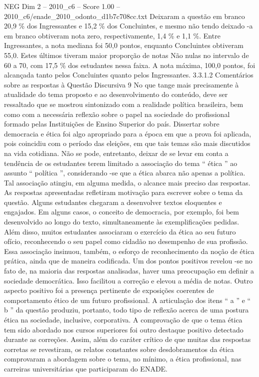 \begin{textsample}{NEG Dim 2 – 2010\_c6 – Score 1.00 – 2010\_c6/enade\_2010\_odonto\_d1b7c708cc.txt}
Deixaram a questão em branco 20,9 \% dos Ingressantes e 15,2 \% dos Concluintes, e mesmo não tendo deixado -a em branco obtiveram nota zero, respectivamente, 1,4 \% e 1,1 \%.
Entre Ingressantes, a nota mediana foi 50,0 pontos, enquanto Concluintes obtiveram 55,0.
Estes últimos tiveram maior proporção de notas Não nulas no intervalo de 60 a 70, com 17,5 \% dos estudantes nessa faixa.
A nota máxima, 100,0 pontos, foi alcançada tanto pelos Concluintes quanto pelos Ingressantes. 3.3.1.2 Comentários sobre as respostas à Questão Discursiva 9 No que tange mais precisamente à atualidade do tema proposto e ao desenvolvimento do conteúdo, deve ser ressaltado que se mostrou sintonizado com a realidade política brasileira, bem como com a necessária reflexão sobre o papel na sociedade do profissional formado pelas Instituições de Ensino Superior do país.
Dissertar sobre democracia e ética foi algo apropriado para a época em que a prova foi aplicada, pois coincidiu com o período das eleições, em que tais temas são mais discutidos na vida cotidiana.
Não se pode, entretanto, deixar de se levar em conta a tendência de os estudantes terem limitado a associação do tema “ ética ” ao assunto “ política ”, considerando -se que a ética abarca não apenas a política.
Tal associação atingiu, em alguma medida, o alcance mais preciso das respostas.
As respostas apresentadas refletiram motivação para escrever sobre o tema da questão.
Alguns estudantes chegaram a desenvolver textos eloquentes e engajados.
Em alguns casos, o conceito de democracia, por exemplo, foi bem desenvolvido ao longo do texto, simultaneamente às exemplificações pedidas.
Além disso, muitos estudantes associaram o exercício da ética ao seu futuro ofício, reconhecendo o seu papel como cidadão no desempenho de sua profissão.
Essa associação insinuou, também, o esforço de reconhecimento da noção de ética prática, ainda que de maneira codificada.
Um dos pontos positivos revelou -se no fato de, na maioria das respostas analisadas, haver uma preocupação em definir a sociedade democrática.
Isso facilitou a correção e elevou a média de notas.
Outro aspecto positivo foi a presença pertinente de exposições coerentes de comportamento ético de um futuro profissional.
A articulação dos itens “ a ” e “ b ” da questão produziu, portanto, todo tipo de reflexão acerca de uma postura ética na sociedade, inclusive, corporativa.
A comprovação de que o tema ética tem sido abordado nos cursos superiores foi outro destaque positivo detectado durante as correções.
Assim, além do caráter crítico de que muitas das respostas corretas se revestiram, os relatos constantes sobre desdobramentos da ética comprovaram a abordagem sobre o tema, no mínimo, a ética profissional, nas carreiras universitárias que participaram do ENADE.

\end{textsample}
